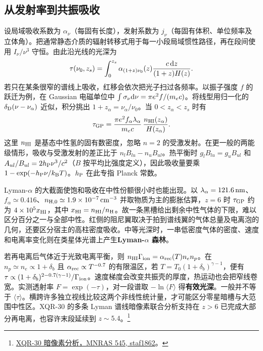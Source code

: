 \subsection{从发射率到共振吸收}

设局域吸收系数为 $\alpha_\nu$（每固有长度），发射系数为 $j_\nu$（每固有体积、单位频率及立体角）。把通常静态介质的辐射转移式用于每一小段局域惯性路径，再在段间使用 $I_\nu/\nu^3$ 守恒。由此沿光线的光深为
\[
 \tau(\nu_0,z_s)=\int_0^{z_s}
   \alpha_{(1+z)\nu_0}(z)\frac{c\,\dd z}{(1+z)H(z)} .
\]
若只在某条很窄的谱线上吸收，红移会依次把光子扫过各频率。以振子强度 $f$ 的跃迁为例，在 Gaussian 电磁单位中 $\int\sigma_\nu\dd\nu=\pi e^2 f/(m_ec)$。将线型用归一化的 $\delta_{\rm D}(\nu-\nu_\alpha)$ 近似，积分挑出 $1+z_\alpha=\nu_\alpha/\nu_0$。当 $0<z_\alpha<z_s$ 时有
\begin{equation}\label{eq:cosmo-gp}
 \tau_{\rm GP}=\frac{\pi e^2 f_\alpha\lambda_\alpha}{m_ec}\,
                    \frac{n_{\rm HI}(z_\alpha)}{H(z_\alpha)} .
\end{equation}
这里 $n_{\rm HI}$ 是基态中性氢的固有数密度，忽略 $n=2$ 的受激发射。在更一般的两能级情形，吸收与受激发射的差正比于 $n_l B_{lu}-n_u B_{ul}$。热平衡时 $g_lB_{lu}=g_uB_{ul}$ 和 $A_{ul}/B_{ul}=2h_{\rm P}\nu^3/c^2$（$B$ 按平均比强度定义），因此吸收量要乘 $1-\exp(-h_{\rm P}\nu/k_{\rm B}T)$。$h_{\rm P}$ 在此专指 Planck 常数。

Lyman-$\alpha$ 的大截面使饱和吸收在中性份额很小时也能出现。以 $\lambda_\alpha=121.6\,{\rm nm}$、$f_\alpha\simeq0.416$、$n_{\rm H,0}\simeq1.9\times10^{-7}\,{\rm cm^{-3}}$ 并取物质为主的膨胀估算，$z=6$ 时 $\tau_{\rm GP}$ 约为 $4\times10^5 x_{\rm HI}$，其中 $x_{\rm HI}=n_{\rm HI}/n_{\rm H}$。故一条黑槽给出剩余中性气体的下限，难以区分百分之一与全部中性。红侧的阻尼翼取决于拍到谱线翼的气体总量及电离泡的几何，还要区分宿主的高柱密度吸收。中等光深时，一串低密度气体的密度、速度和电离率变化则在类星体光谱上产生\textbf{Lyman-$\alpha$ 森林}。

若再电离后气体近于光致电离平衡，则 $n_{\rm HI}\Gamma_{\rm ion}=\alpha_{\rm rec}(T)n_e n_p$。在 $n_p\simeq n_e\propto1+\delta_b$ 且 $\alpha_{\rm rec}\propto T^{-0.7}$ 的有限温区，若 $T=T_0(1+\delta_b)^{\gamma-1}$，便有 $\tau\propto (1+\delta_b)^{2-0.7(\gamma-1)}/\Gamma_{\rm ion}$。速度梯度会改变共振壳的厚度，热运动也会把窄线卷宽。实测透射率 $F=\exp(-\tau)$，对一段谱取 $-\ln\langle F\rangle$ 得\textbf{有效光深}。一般并不等于 $\langle\tau\rangle$。横跨许多独立视线比较这两个非线性统计量，才可能区分零星暗槽与大范围中性区。XQR-30 的多条 Lyman 谱线暗像素联合分析支持在 $z>6$ 已完成大部分再电离，也容许末段延续到 $z\sim5.4$。\footnote{\href{https://doi.org/10.1093/mnras/staf1862}{XQR-30 暗像素分析，MNRAS 545, staf1862}。}

